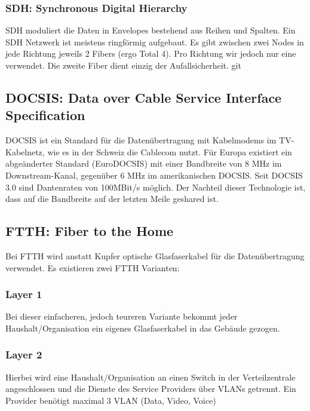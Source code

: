 \subsubsection{SDH: Synchronous Digital Hierarchy}
SDH  moduliert die Daten in Envelopes bestehend aus Reihen und Spalten. Ein SDH Netzwerk ist meistens ringförmig aufgebaut. Es gibt zwischen zwei Nodes in jede Richtung jeweils 2 Fibers (ergo Total 4). Pro Richtung wir jedoch nur eine verwendet. Die zweite Fiber dient einzig der Aufallsicherheit.
git 
\subsection{DOCSIS: Data over Cable Service Interface Specification}
DOCSIS ist ein Standard für die Datenübertragung mit Kabelmodems im TV-Kabelnetz, wie es in der Schweiz die Cablecom nutzt. Für Europa existiert ein abgeänderter Standard (EuroDOCSIS) mit einer Bandbreite von 8 MHz im Downstream-Kanal, gegenüber 6 MHz im amerikanischen DOCSIS. Seit DOCSIS 3.0 sind Dantenraten von 100MBit/s möglich. Der Nachteil dieser Technologie ist, dass auf die Bandbreite auf der letzten Meile geshared ist.

\subsection{FTTH: Fiber to the Home}
Bei FTTH wird anstatt Kupfer optische Glasfaserkabel für die Datenübertragung verwendet. Es existieren zwei FTTH Varianten:

\subsubsection{Layer 1}
Bei dieser einfacheren, jedoch teureren Variante bekommt jeder Haushalt/Organisation ein eigenes Glasfaserkabel in das Gebäude gezogen. 

\subsubsection{Layer 2}
Hierbei wird eine Haushalt/Organisation an einen Switch in der Verteilzentrale angeschlossen und die Dienste des Service Providers über VLANs getrennt. Ein Provider benötigt maximal 3 VLAN (Data, Video, Voice)
	
